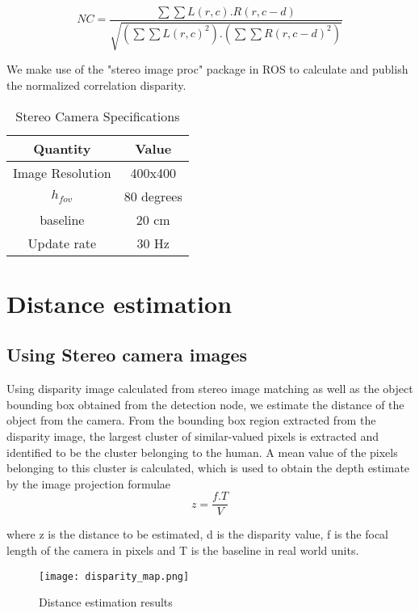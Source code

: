	\begin{equation}NC = \frac{\sum\sum L(r,c).R(r,c-d)}{\sqrt{(\sum\sum L(r,c)^2).(\sum\sum R(r,c-d)^2)}}\end{equation}
	
	We make use of the "stereo image proc" package in ROS to calculate and publish the normalized correlation disparity.
	
	\begin{table}[h!]
		\centering
		\begin{tabular}{| c | c |}
			\hline
			\textbf{Quantity}	& \textbf{Value}	\\ \hline  \hline
			Image Resolution		& 400x400	\\ \hline
			$h_{fov}$	& 80 degrees	\\ \hline
			baseline		& 20 cm		\\ \hline
			Update rate	& 30 Hz		\\ \hline
		\end{tabular}
		\caption{Stereo Camera Specifications}
		\label{table:Stereo Camera Specifications}
	\end{table}
	
	
	\newpage
	\section{Distance estimation}
	\label{sec:Distance estimation}
	
	\subsection{Using Stereo camera images}
	Using disparity image calculated from stereo image matching as well as the object bounding box obtained from the detection node, we estimate the distance of the object from the camera. From the bounding box region extracted from
	the disparity image, the largest cluster of similar-valued pixels is extracted and identified to be the cluster belonging to the human. A mean value of the pixels belonging to this cluster is calculated, which is used to obtain the depth
	estimate by the image projection formulae
	\begin{equation}z = \frac{f.T}{V}\end{equation}
	
	where z is the distance to be estimated, d is the disparity value, f is the focal length of the camera in pixels and T is the baseline in real world units.
	\begin{figure}[htbp]
		\centering
		\texttt{[image: disparity\_map.png]}
		\caption{Distance estimation results \label{Distance estimation results}}
	\end{figure}
	
